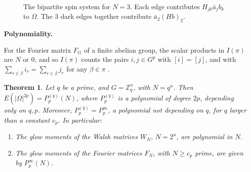 \documentclass[11pt,a4paper]{article}
\newtheorem{thm}{Theorem}[section]
\theoremstyle{remark}
\begin{document}
\medskip
\suppressfloats[t]
\begin{figure}[t]
\centering
{}
\caption{The bipartite spin system for $N=3$. Each edge contributes
$H_{jk}\bar a_j b_k$ to $\Omega$. The 3 dark edges together contribute
$\bar a_2(Hb)_2$.}\label{fig:bipartite}
\end{figure}

\noindent\textbf{Polynomiality.}

For the Fourier matrix $F_G$ of a finite abelian group, the scalar products in $I(\pi)$ are $N$ or $0$, and so $I(\pi)$ counts the pairs $i,j\in G^p$ with $[i]=[j]$, and with $\sum_{r\in\beta}i_r=\sum_{r\in\beta}j_r$ for any $\beta\in\pi$ \cite[Proposition 3.1]{banica}.

\begin{samepage}
\begin{thm}\label{thm:poly}
Let $q$ be a prime, and $G=\mathbb Z_q^n$, with $N=q^n$. Then $E(|\Omega|^{2p})=P^{(q)}_p(N)$, where $P^{(q)}_p$ is a polynomial of degree $2p$, depending only on $q,p$. Moreover, $P^{(q)}_p=P^\infty_p$, a polynomial not depending on $q$, for $q$ larger than a constant $c_p$. In particular:
\begin{enumerate}
\item The glow moments of the Walsh matrices $W_N$, $N=2^n$, are polynomial in $N$.

\item The glow moments of the Fourier matrices $F_N$, with $N\geq c_p$ prime, are given by $P^\infty_p(N)$.
\end{enumerate}
\end{thm}
\end{samepage}
\end{document}
